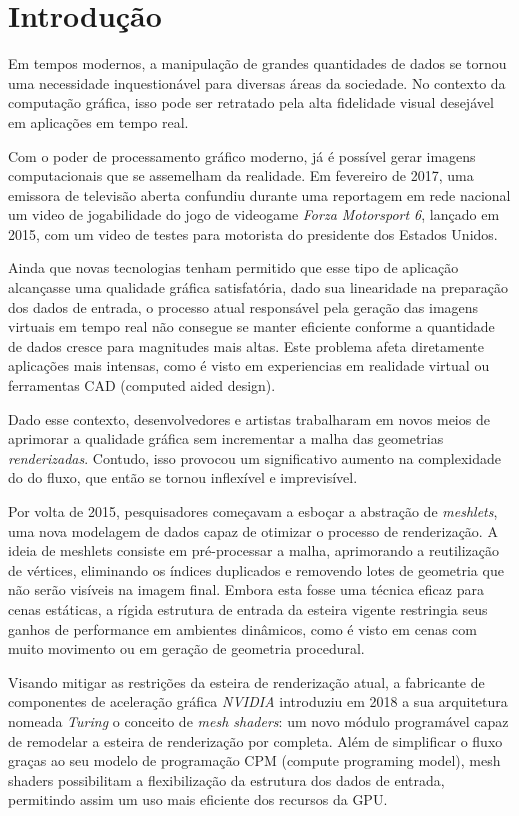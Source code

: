 \chapter{Introdução}\label{chp:LABEL_INTRODUCAO}


Em tempos modernos, a manipulação de grandes quantidades de dados se tornou uma necessidade inquestionável para diversas áreas da sociedade. No contexto da computação gráfica, isso pode ser retratado pela alta fidelidade visual desejável em aplicações em tempo real.

Com o poder de processamento gráfico moderno, já é possível gerar imagens computacionais que se assemelham da realidade. Em fevereiro de 2017, uma emissora de televisão aberta confundiu durante uma reportagem em rede nacional um video de jogabilidade do jogo de videogame \textit{Forza Motorsport 6}, lançado em 2015, com um video de testes para motorista do presidente dos Estados Unidos.

Ainda que novas tecnologias tenham permitido que esse tipo de aplicação alcançasse uma qualidade gráfica satisfatória, dado sua linearidade na preparação dos dados de entrada, o processo atual responsável pela geração das imagens virtuais em tempo real não consegue se manter eficiente conforme a quantidade de dados cresce para magnitudes mais altas. Este problema afeta diretamente aplicações mais intensas, como é visto em experiencias em realidade virtual ou ferramentas CAD (computed aided design).

Dado esse contexto, desenvolvedores e artistas trabalharam em novos meios de aprimorar a qualidade gráfica sem incrementar a malha das geometrias \textit{renderizadas}. Contudo, isso provocou um significativo aumento na complexidade do do fluxo, que então se tornou inflexível e imprevisível. \cite{TECR_MESH_SHADERS_DIRECTX_12}

Por volta de 2015, pesquisadores começavam a esboçar a abstração de \textit{meshlets}, uma nova modelagem de dados capaz de otimizar o processo de renderização. A ideia de meshlets consiste em pré-processar a malha, aprimorando a reutilização de vértices, eliminando os índices duplicados e removendo lotes de geometria que não serão visíveis na imagem final. Embora esta fosse uma técnica eficaz para cenas estáticas, a rígida estrutura de entrada da esteira vigente restringia seus ganhos de performance em ambientes dinâmicos, como é visto em cenas com muito movimento ou em geração de geometria procedural.

Visando mitigar as restrições da esteira de renderização atual, a fabricante de componentes de aceleração gráfica \textit{NVIDIA} introduziu em 2018 a sua arquitetura nomeada \textit{Turing} \cite{TECR_TURING_ARCHITETURE} o conceito de \textit{mesh shaders}: um novo módulo programável capaz de remodelar a esteira de renderização por completa. Além de simplificar o fluxo graças ao seu modelo de programação CPM (compute programing model), mesh shaders possibilitam a flexibilização da estrutura dos dados de entrada, permitindo assim um uso mais eficiente dos recursos da GPU.

